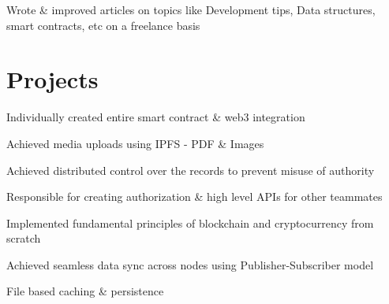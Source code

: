 \documentclass[]{deedy-resume-openfont}
\begin{document}
\begin{minipage}[t]{0.605\textwidth}
Wrote {\&} improved articles on topics like Development tips, Data structures, smart contracts, etc on a freelance basis
\sectionsep


\section{Projects}

\begin{tightemize}
\item Individually created entire smart contract {\&} web3 integration
\item Achieved media uploads using IPFS - PDF {\&} Images
\item Achieved distributed control over the records to prevent misuse of authority
\item Responsible for creating authorization {\&} high level APIs for other teammates
\end{tightemize}
\sectionsep


\begin{tightemize}
\item Implemented fundamental principles of blockchain and cryptocurrency from scratch
\item Achieved seamless data sync across nodes using Publisher-Subscriber model
\item File based caching {\&} persistence
\end{tightemize}
\sectionsep



\end{minipage}
\end{document}
